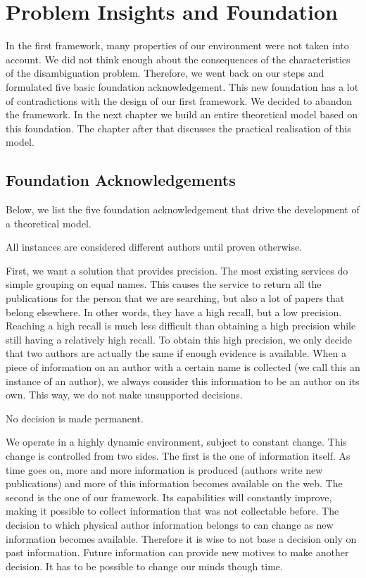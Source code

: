 \chapter{Problem Insights and Foundation}

In the first framework, many properties of our environment were not taken into account. We did not think enough about the consequences of the characteristics of the disambiguation problem. Therefore, we went back on our steps and formulated five basic foundation acknowledgement. This new foundation has a lot of contradictions with the design of our first framework. We decided to abandon the framework. In the next chapter we build an entire theoretical model based on this foundation. The chapter after that discusses the practical realisation of this model.

\section{Foundation Acknowledgements}
\label{foundation}

Below, we list the five foundation acknowledgement that drive the development of a theoretical model.

\begin{foundation}
\label{foundation:different}
All instances are considered different authors until proven otherwise.
\end{foundation}

First, we want a solution that provides precision. The most existing services do simple grouping on equal names. This causes the service to return all the publications for the person that we are searching, but also a lot of papers that belong elsewhere. In other words, they have a high recall, but a low precision. Reaching a high recall is much less difficult than obtaining a high precision while still having a relatively high recall. To obtain this high precision, we only decide that two authors are actually the same if enough evidence is available. When a piece of information on an author with a certain name is collected (we call this an instance of an author), we always consider this information to be an author on its own. This way, we do not make unsupported decisions.

\begin{foundation}
\label{foundation:decision}
No decision is made permanent.
\end{foundation}

We operate in a highly dynamic environment, subject to constant change. This change is controlled from two sides. The first is the one of information itself. As time goes on, more and more information is produced (authors write new publications) and more of this information becomes available on the web. The second is the one of our framework. Its capabilities will constantly improve, making it possible to collect information that was not collectable before. The decision to which physical author information belongs to can change as new information becomes available. Therefore it is wise to not base a decision only on past information. Future information can provide new motives to make another decision. It has to be possible to change our minds though time.

